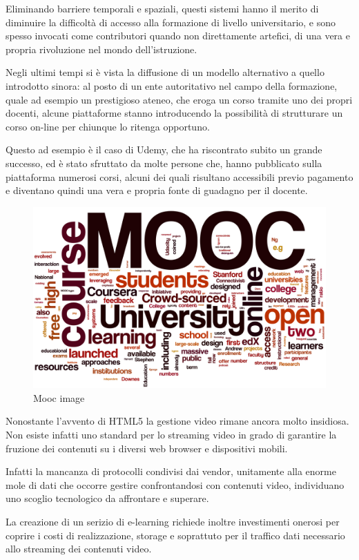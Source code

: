 Eliminando barriere temporali e spaziali, questi sistemi hanno il merito di diminuire la difficoltà di accesso alla formazione di livello universitario, e sono spesso invocati come contributori quando non direttamente artefici, di una vera e propria rivoluzione nel mondo dell'istruzione.

Negli ultimi tempi si è vista la diffusione di un modello alternativo a quello introdotto sinora: al posto di un ente autoritativo nel campo della formazione, quale ad esempio un prestigioso ateneo, che eroga un corso tramite uno dei propri docenti, alcune piattaforme stanno introducendo la possibilità di strutturare un corso on-line per chiunque lo ritenga opportuno.

Questo ad esempio è il caso di Udemy, che ha riscontrato subito un grande successo, ed è stato sfruttato da molte persone che, hanno pubblicato sulla piattaforma numerosi corsi, alcuni dei quali risultano accessibili previo pagamento e diventano quindi una vera e propria fonte di guadagno per il docente.

\begin{figure}[htb] %
 \centering
 \includegraphics[width=0.7\linewidth]{images/introduction/mooc.png}\hfill
 \caption[Mooc image]{Mooc image}
 \label{fig:fourV}
\end{figure}


Nonostante l'avvento di HTML5 la gestione video rimane ancora molto insidiosa. Non esiste infatti uno standard per lo streaming video in grado di garantire la fruzione dei contenuti su i diversi web browser e dispositivi mobili.

Infatti la mancanza di protocolli condivisi dai vendor, unitamente alla enorme mole di dati che occorre gestire confrontandosi con contenuti video, individuano uno scoglio tecnologico da affrontare e superare.

La creazione di un serizio di e-learning richiede inoltre investimenti onerosi per coprire i costi di realizzazione, storage e soprattuto per il traffico dati necessario allo streaming dei contenuti video.


